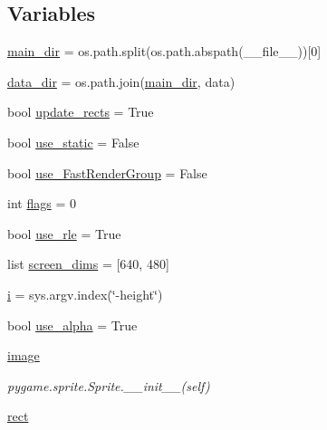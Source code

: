 \subsection*{Variables}
\begin{DoxyCompactItemize}
\item 
\hyperlink{namespacepygame_1_1examples_1_1testsprite_a24fa3debe1d235064adcb42cd8b59d9a}{main\+\_\+dir} = os.\+path.\+split(os.\+path.\+abspath(\+\_\+\+\_\+file\+\_\+\+\_\+))\mbox{[}0\mbox{]}
\item 
\hyperlink{namespacepygame_1_1examples_1_1testsprite_a5540d97cc37613b1334a3e951c589bb2}{data\+\_\+dir} = os.\+path.\+join(\hyperlink{namespacepygame_1_1examples_1_1testsprite_a24fa3debe1d235064adcb42cd8b59d9a}{main\+\_\+dir}, \textquotesingle{}data\textquotesingle{})
\item 
bool \hyperlink{namespacepygame_1_1examples_1_1testsprite_a906a5e04b052b7f10501a74fd4101131}{update\+\_\+rects} = True
\item 
bool \hyperlink{namespacepygame_1_1examples_1_1testsprite_a70337598049fd97cee98739bd33b191c}{use\+\_\+static} = False
\item 
bool \hyperlink{namespacepygame_1_1examples_1_1testsprite_a393ba62891dcfc21f64d4fdd0e136dbb}{use\+\_\+\+Fast\+Render\+Group} = False
\item 
int \hyperlink{namespacepygame_1_1examples_1_1testsprite_a57f2563beaba10d099978d40faf0e508}{flags} = 0
\item 
bool \hyperlink{namespacepygame_1_1examples_1_1testsprite_a172751a34aa715703fefd84b85aabcf5}{use\+\_\+rle} = True
\item 
list \hyperlink{namespacepygame_1_1examples_1_1testsprite_a9876b374b00da448006c729075d3139d}{screen\+\_\+dims} = \mbox{[}640, 480\mbox{]}
\item 
\hyperlink{namespacepygame_1_1examples_1_1testsprite_ad068209b867531ccc7b24ee9aafe5c08}{i} = sys.\+argv.\+index(\char`\"{}-\/height\char`\"{})
\item 
bool \hyperlink{namespacepygame_1_1examples_1_1testsprite_afd8c032ad3fc95a2d20aaa32b0f2d496}{use\+\_\+alpha} = True
\item 
\hyperlink{namespacepygame_1_1examples_1_1testsprite_aa974aed5d4c98c2f9703dbc817e2be83}{image}
\begin{DoxyCompactList}\small\item\em pygame.\+sprite.\+Sprite.\+\_\+\+\_\+init\+\_\+\+\_\+(self) \end{DoxyCompactList}\item 
\hyperlink{namespacepygame_1_1examples_1_1testsprite_a259cd52183325c126d19a980b8b0e1b7}{rect}

\end{DoxyCompactItemize}
